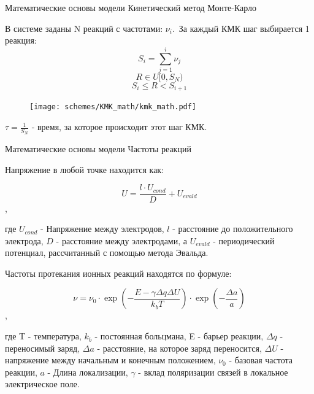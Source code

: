 \documentclass{beamer}%
\begin{document}












\begin{frame}{Математические основы модели} {Кинетический метод Монте-Карло}



В системе заданы N реакций с частотами: $\nu_i$.\
За каждый КМК шаг выбирается 1 реакция:
\[S_i = \sum_{j=1}^{i}{\nu_j}\]
\[R \in U[0,S_N)\]
\[S_i \le R < S_{i+1}\] 

\begin{figure}
    \centering
    \texttt{[image: schemes/KMK\_math/kmk\_math.pdf]}
\end{figure}

$\tau = \frac{1}{S_N}$ - время, за которое происходит этот шаг КМК.

\end{frame}


\begin{frame}{Математические основы модели} {Частоты реакций}

    \small

    Напряжение в любой точке находится как:

    \[U = \frac{l\cdot U_{cond}}{D}+U_{evald}\],

    где \(U_{cond}\) - Напряжение между электродов, \(l\) - расстояние до положительного электрода, \(D\) - расстояние между электродами, а \(U_{evald}\) - периодический потенциал, рассчитанный с помощью метода Эвальда.

    Частоты протекания ионных реакций находятся по формуле:

    \[\nu = \nu _0 \cdot
    \exp{(-\frac{E-\gamma \Delta q \Delta U}{k_bT})} \cdot
    \exp{(-\frac{\Delta a}{a})}
    \],

    где T - температура,
    \(k_b\) - постоянная больцмана,
    E - барьер реакции,
    \(\Delta q\) - переносимый заряд,
    \(\Delta a\) - расстояние, на которое заряд переносится,
    \(\Delta U\) - напряжение между начальным и конечным положением,
    \(\nu_0\)  - базовая частота реакции,
    \(a\) - Длина локализации,
    \(\gamma\) - вклад поляризации связей в локальное электрическое поле.
    

    
\end{frame}
\end{document}
